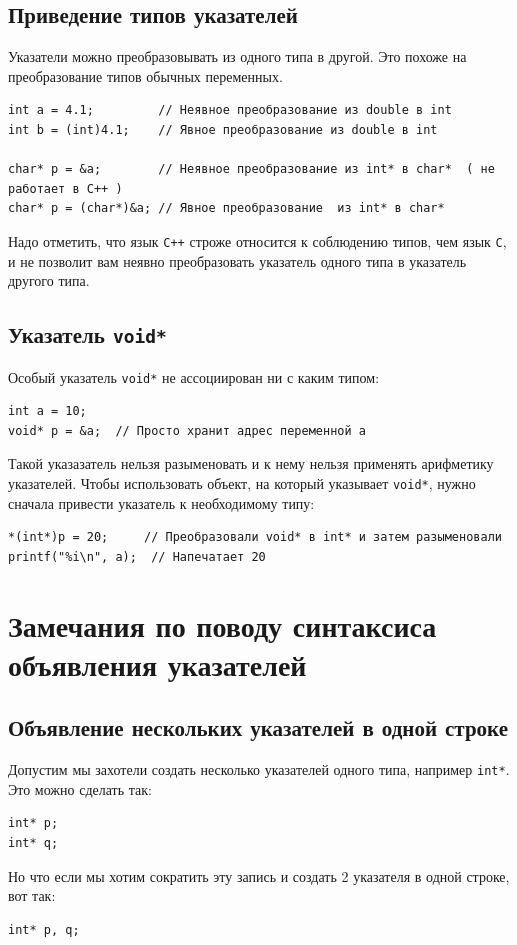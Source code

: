 \documentclass[10pt]{article}
\begin{document}
\subsection*{Приведение типов указателей}
Указатели можно преобразовывать из одного типа в другой. Это похоже на преобразование типов обычных переменных.
\begin{lstlisting}
int a = 4.1;         // Неявное преобразование из double в int
int b = (int)4.1;    // Явное преобразование из double в int

char* p = &a;        // Неявное преобразование из int* в char*  ( не работает в C++ )
char* p = (char*)&a; // Явное преобразование  из int* в char*
\end{lstlisting}
Надо отметить, что язык \texttt{C++} строже относится к соблюдению типов, чем язык \texttt{C}, и не позволит вам неявно преобразовать указатель одного типа в указатель другого типа.


\subsection*{Указатель \texttt{void*}}
Особый указатель \texttt{void*} не ассоциирован ни с каким типом:
\begin{lstlisting}
int a = 10;
void* p = &a;  // Просто хранит адрес переменной a
\end{lstlisting}
Такой указазатель нельзя разыменовать и к нему нельзя применять арифметику указателей.
Чтобы использовать объект, на который указывает \texttt{void*}, нужно сначала привести указатель к необходимому типу:
\begin{lstlisting}
*(int*)p = 20;     // Преобразовали void* в int* и затем разыменовали
printf("%i\n", a);  // Напечатает 20
\end{lstlisting}



\newpage
\section*{Замечания по поводу синтаксиса объявления указателей}
\subsection*{Объявление нескольких указателей в одной строке}
Допустим мы захотели создать несколько указателей одного типа, например \texttt{int*}. Это можно сделать так:
\begin{lstlisting}
int* p;
int* q;
\end{lstlisting}
Но что если мы хотим сократить эту запись и создать 2 указателя в одной строке, вот так:
\begin{lstlisting}
int* p, q;
\end{lstlisting}
\end{document}
